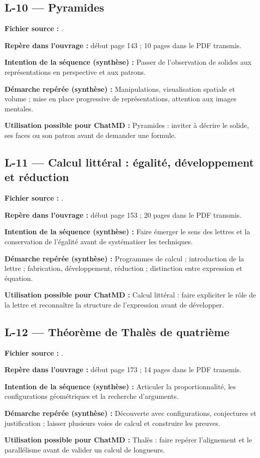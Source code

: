 \documentclass[11pt,a4paper]{article}
\begin{document}
\subsection{L-10 — Pyramides}
\textbf{Fichier source :} .\par
\textbf{Repère dans l’ouvrage :} début page 143 ; 10 pages dans le PDF transmis.\par
\textbf{Intention de la séquence (synthèse) :} Passer de l’observation de solides aux représentations en perspective et aux patrons.\par
\textbf{Démarche repérée (synthèse) :} Manipulations, visualisation spatiale et volume ; mise en place progressive de représentations, attention aux images mentales.\par
\textbf{Utilisation possible pour ChatMD :} Pyramides : inviter à décrire le solide, ses faces ou son patron avant de demander une formule.\par
\subsection{L-11 — Calcul littéral : égalité, développement et réduction}
\textbf{Fichier source :} .\par
\textbf{Repère dans l’ouvrage :} début page 153 ; 20 pages dans le PDF transmis.\par
\textbf{Intention de la séquence (synthèse) :} Faire émerger le sens des lettres et la conservation de l’égalité avant de systématiser les techniques.\par
\textbf{Démarche repérée (synthèse) :} Programmes de calcul ; introduction de la lettre ; fabrication, développement, réduction ; distinction entre expression et équation.\par
\textbf{Utilisation possible pour ChatMD :} Calcul littéral : faire expliciter le rôle de la lettre et reconnaître la structure de l’expression avant de développer.\par
\subsection{L-12 — Théorème de Thalès de quatrième}
\textbf{Fichier source :} .\par
\textbf{Repère dans l’ouvrage :} début page 173 ; 14 pages dans le PDF transmis.\par
\textbf{Intention de la séquence (synthèse) :} Articuler la proportionnalité, les configurations géométriques et la recherche d’arguments.\par
\textbf{Démarche repérée (synthèse) :} Découverte avec configurations, conjectures et justification ; laisser plusieurs voies de calcul et construire les preuves.\par
\textbf{Utilisation possible pour ChatMD :} Thalès : faire repérer l’alignement et le parallélisme avant de valider un calcul de longueurs.\par
\end{document}
